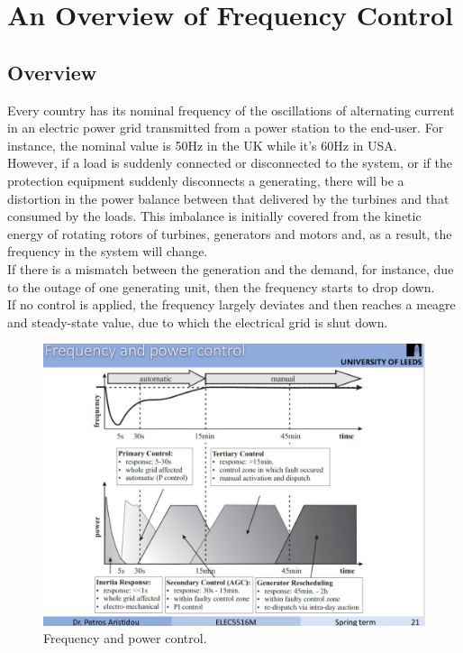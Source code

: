 \documentclass{report}
\begin{document}
\chapter{An Overview of Frequency Control}
\label{Chapter2}
\section{Overview} %
Every country has its nominal frequency of the oscillations of alternating current in an electric power grid transmitted from a power station to the end-user. For instance, the nominal value is 50Hz in the UK while it’s 60Hz in USA.\\

However, if a load is suddenly connected or disconnected to the system, or if the protection equipment suddenly disconnects a generating, there will be a distortion in the power balance between that delivered by the turbines and that consumed by the loads. This imbalance is initially covered from the kinetic energy of rotating rotors of turbines, generators and motors and, as a result, the frequency in the system will change. \\

If there is a mismatch between the generation and the demand, for instance, due to the outage of one generating unit, then the frequency starts to drop down. \\

If no control is applied, the frequency largely deviates and then reaches a meagre and steady-state value, due to which the electrical grid is shut down.\\

\begin{figure}[htbp]
\centering
\includegraphics[width = .819\textwidth]{figure/2_1_freq.jpeg}
\caption{Frequency and power control.}
\label{2_1_freq}
\end{figure}
\end{document}
